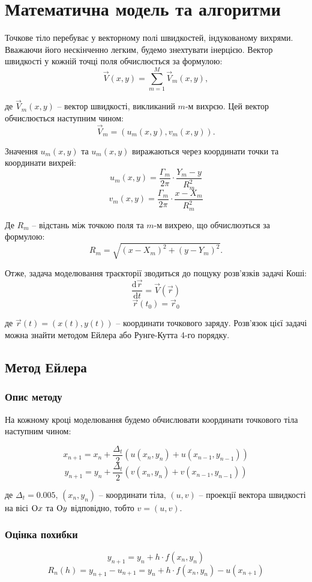 \documentclass[a4paper,12pt]{article}
\begin{document}
\section{Математична модель та алгоритми}
Точкове тіло перебуває у векторному полі швидкостей, індукованому вихрями. Вважаючи його нескінченно легким, будемо знехтувати інерцією. Вектор швидкості у кожній точці поля обчислюється за формулою:
$$ \overrightarrow{V}(x, y) = \sum_{m=1}^{M} {\overrightarrow{V}_m(x, y)},$$

де $\overrightarrow{V}_m(x, y)$ -- вектор швидкості, викликаний $m$-м вихрєю. Цей вектор обчислюється наступним чином:
$$ \overrightarrow{V}_m = (u_m(x, y), v_m(x, y)).$$

Значення $u_m(x,y)$ та $u_m(x,y)$ виражаються через координати точки та координати вихрей:
$$  u_m (x, y) = \frac{\Gamma_m}{2 \pi} \cdot \frac{Y_m - y}{R^2_m} $$
$$  v_m (x, y) = \frac{\Gamma_m}{2 \pi} \cdot \frac{x - X_m}{R^2_m} $$

Де $R_m$ -- відстань між точкою поля та $m$-м вихрею, що обчислюэться за формулою:
$$ R_m = \sqrt{(x-X_m)^2 + (y-Y_m)^2}. $$

Отже, задача моделювання траєкторії зводиться до пощуку розв'язків задачі Коші:
$$\frac{\mathrm{d} \overrightarrow{r}}{\mathrm{d} t} = \overrightarrow{V}(\overrightarrow{r})$$
$$\overrightarrow{r}(t_0) = \overrightarrow{r}_0$$

де $\overrightarrow{r}(t) = \left( x(t), y(t)\right)$ -- координати точкового заряду. Розв'язок цієї задачі можна знайти методом Ейлера або Рунге-Кутта 4-го порядку.


\subsection{Метод Ейлера}
\subsubsection{Опис методу}
На кожному кроці моделювання будемо обчислювати координати точкового тіла наступним чином:

$$ x_{n+1} = x_n + \frac{\Delta_t}{2} (u(x_n, y_n) + u(x_{n-1}, y_{n-1})) $$
$$ y_{n+1} = y_n + \frac{\Delta_t}{2} (v(x_n, y_n) + v(x_{n-1}, y_{n-1})) $$

де $\Delta_t = 0.005$, $(x_n, y_n)$ – координати тіла, $(u,v)$ – проекції вектора швидкості  на вісі $\textup{O}x$ та $\textup{O}y$ відповідно, тобто $v=(u,v)$.

\subsubsection{Оцінка похибки}
$$y_{n+1} = y_n + h \cdot f(x_n, y_n)$$
$$R_n(h) = y_{n+1} - u_{n+1} = y_n + h \cdot f(x_n, y_n) - u(x_{n+1})$$
\end{document}
